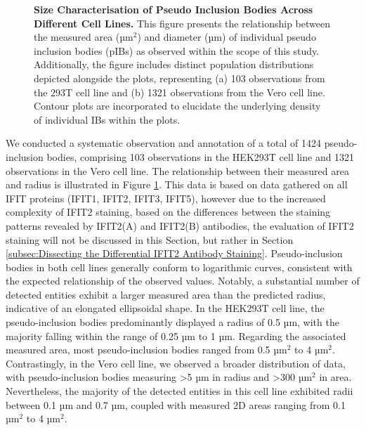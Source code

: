 \begin{figure}
\begin{subfigure}{0.495\textwidth}
    \end{subfigure}
    \caption[Size Characterisation of Pseudo Inclusion Bodies Across Different Cell Lines.]{\textbf{Size Characterisation of Pseudo Inclusion Bodies Across Different Cell Lines.} This figure presents the relationship between the measured area (\(\mbox{µm}^2\)) and diameter (µm) of individual pseudo inclusion bodies (pIBs) as observed within the scope of this study. Additionally, the figure includes distinct population distributions depicted alongside the plots, representing (a) 103 observations from the 293T cell line and (b) 1321 observations from the Vero cell line. Contour plots are incorporated to elucidate the underlying density of individual IBs within the plots.}
    \label{fig:Size Characterisation of Pseudo Inclusion Bodies Across Different Cell Lines}
\end{figure}

We conducted a systematic observation and annotation of a total of 1424 pseudo-inclusion bodies, comprising 103 observations in the HEK293T cell line and 1321 observations in the Vero cell line. The relationship between their measured area and radius is illustrated in Figure \ref{fig:Size Characterisation of Pseudo Inclusion Bodies Across Different Cell Lines}. This data is based on data gathered on all IFIT proteins (IFIT1, IFIT2, IFIT3, IFIT5), however due to the increased complexity of IFIT2 staining, based on the differences between the staining patterns revealed by IFIT2(A) and IFIT2(B) antibodies, the evaluation of IFIT2 staining will not be discussed in this Section, but rather in Section \ref{subsec:Dissecting the Differential IFIT2 Antibody Staining}. Pseudo-inclusion bodies in both cell lines generally conform to logarithmic curves, consistent with the expected relationship of the observed values. Notably, a substantial number of detected entities exhibit a larger measured area than the predicted radius, indicative of an elongated ellipsoidal shape. In the HEK293T cell line, the pseudo-inclusion bodies predominantly displayed a radius of 0.5 µm, with the majority falling within the range of 0.25 µm to 1 µm. Regarding the associated measured area, most pseudo-inclusion bodies ranged from 0.5 \(\mbox{µm}^2\) to 4 \(\mbox{µm}^2\). Contrastingly, in the Vero cell line, we observed a broader distribution of data, with pseudo-inclusion bodies measuring >5 µm in radius and >300 \(\mbox{µm}^2\) in area. Nevertheless, the majority of the detected entities in this cell line exhibited radii between 0.1 µm and 0.7 µm, coupled with measured 2D areas ranging from 0.1 \(\mbox{µm}^2\) to 4 \(\mbox{µm}^2\).

